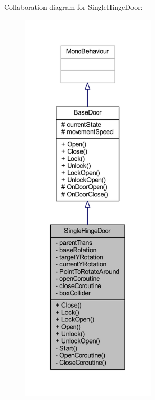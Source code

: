 Collaboration diagram for Single\+Hinge\+Door\+:
\nopagebreak
\begin{figure}[H]
\begin{center}
\leavevmode
\includegraphics[height=550pt]{class_single_hinge_door__coll__graph}
\end{center}
\end{figure}
